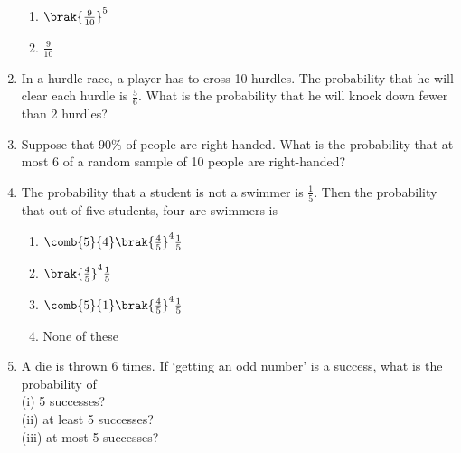 \begin{enumerate}[label=\arabic*.,ref=\thesubsection.\theenumi]
\begin{enumerate}
\item $\brak{\frac{9}{10}}^5$
\item $\frac{9}{10}$
\end{enumerate}
%
\solution

\item In a hurdle race, a player has to cross 10 hurdles. The probability that he will
clear each hurdle is $\frac{5}{6}$. What is the probability that he will knock down fewer than 2 hurdles?\\
\solution 

\item Suppose that 90$\%$ of people are right-handed. What is the probability that
at most 6 of a random sample of 10 people are right-handed?\\
\solution

\item The probability that a student is not a swimmer is $\frac{1}{5}$. Then the probability that out of five students, four are swimmers is\\
\begin{enumerate}
\item $\comb{5}{4}\brak{\frac{4}{5}}^4 \frac{1}{5}$
\item $\brak{\frac{4}{5}}^4 \frac{1}{5}$
\item $\comb{5}{1}\brak{\frac{4}{5}}^4 \frac{1}{5}$
\item None of these
\end{enumerate}
\solution

%
\item A die is thrown 6 times. If ‘getting an odd number’ is a success, what is the probability of\\
(i) 5 successes?\\
(ii) at least 5 successes?\\
(iii) at most 5 successes?\\
%
\solution



\end{enumerate}


